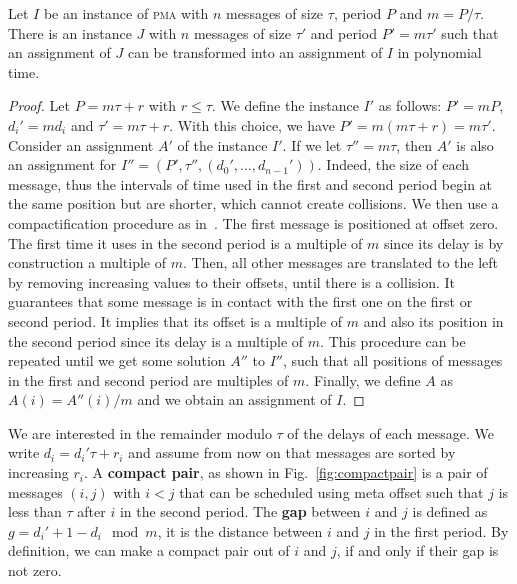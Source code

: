 \documentclass[a4paper,UKenglish,cleveref, autoref, thm-restate]{lipics-v2019}
\newcommand\pma{\textsc{pma}\xspace}
\begin{document}
\begin{lemma}\label{lemma:multiple}
Let $I$ be an instance of \pma with $n$ messages of size $\tau$, period $P$ and $m = P / \tau$. There is an instance $J$ with $n$ messages of size $\tau'$ and period $P'= m\tau'$ such that an assignment of $J$ can be transformed into an assignment of $I$ in polynomial time.
\end{lemma}
\begin{proof}
Let $P = m \tau + r$ with $r \leq \tau$. We define the instance $I'$ as follows: $P' = mP$, $d_{i}' = m d_i$ and $\tau' = m \tau + r$. With this choice, we have $P' = m(m \tau + r) = m \tau'$.
Consider an assignment $A'$ of the instance $I'$.
If we let $\tau'' = m\tau$, then $A'$ is also an assignment for $I'' = (P',\tau'',(d_{0}',\dots,d_{n-1}'))$. Indeed, the size of each message, thus the intervals of time used in the first and second period begin at the same position but are shorter, which cannot create collisions.
We then use a compactification procedure as in~\cite{barth2018deterministic}. The first message is positioned at offset zero. The first time it uses in the second period is a multiple of $m$ since its delay is by construction a multiple of $m$. Then, all other messages are translated to the left by removing increasing values to their offsets, until there is a collision. It guarantees that some message is in contact with the first one on the first or second period.  It implies that its offset is a multiple of $m$ and also its position in the second period since its delay is a multiple of $m$. This procedure can be repeated until we get some solution $A''$ to $I''$, such that all positions of messages in the first and second period are multiples of $m$. Finally, we define $A$ as $A(i) = A''(i)/m$ and we obtain an assignment of $I$.
\end{proof}


We are interested in the remainder modulo $\tau$ of the delays of each message.
We write $d_i = d_{i}'\tau + r_i$ and assume from now on that messages are sorted by increasing $r_i$.
A \textbf{compact pair}, as shown in Fig.~\ref{fig:compactpair} is a pair of messages $(i,j)$ with $i < j$ that can be scheduled using meta offset such that $j$ is less than $\tau$ after $i$ in the second period.
The \textbf{gap} between $i$ and $j$ is defined as  $g = d_{i}' + 1 - d_{i} \mod m$, it is the distance between $i$ and $j$
in the first period. By definition, we can make a compact pair out of $i$ and $j$, if and only if their gap is not zero.
\end{document}
